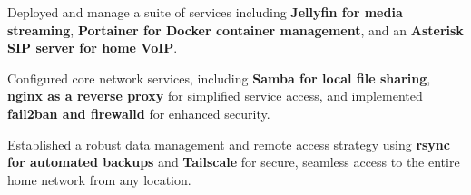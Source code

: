 \documentclass[../main.tex]{subfiles}
\begin{document}
\vspace{0.2 cm}

\begin{twocolentry}{
    \small
    \textit{\href{}{}}
}
\end{twocolentry}

\vspace{0.10 cm}
\begin{onecolentry}
\begin{highlights}
    \item Deployed and manage a suite of services including \textbf{Jellyfin for media streaming}, \textbf{Portainer for Docker container management}, and an \textbf{Asterisk SIP server for home VoIP}.
    \item Configured core network services, including \textbf{Samba for local file sharing}, \textbf{nginx as a reverse proxy} for simplified service access, and implemented \textbf{fail2ban and firewalld} for enhanced security.
    \item Established a robust data management and remote access strategy using \textbf{rsync for automated backups} and \textbf{Tailscale} for secure, seamless access to the entire home network from any location.
\end{highlights}
\end{onecolentry}
\end{document}
